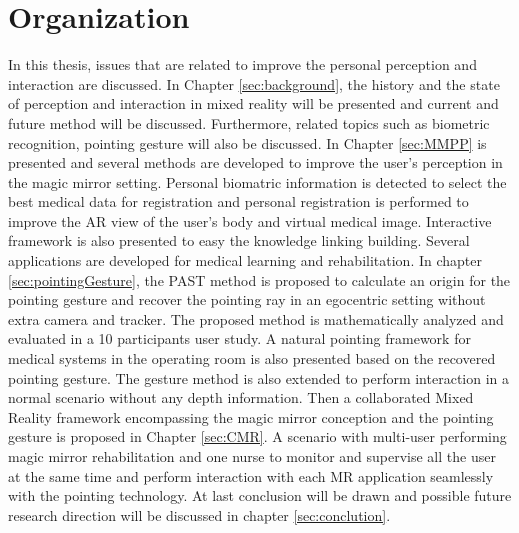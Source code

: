 \section{Organization}
In this thesis, issues that are related to improve the personal perception and interaction are discussed. In Chapter \ref{sec:background}, the history and the state of perception and interaction in mixed reality will be presented and current and future method will be discussed. Furthermore, related topics such as biometric recognition, pointing gesture will also be discussed. 
In Chapter \ref{sec:MMPP} is presented and several methods are developed to improve the user's perception in the magic mirror setting. Personal biomatric information is detected to select the best medical data for registration and personal registration is performed to improve the AR view of the user's body and virtual medical image. Interactive framework is also presented to easy the knowledge linking building. Several applications are developed for medical learning and rehabilitation.
In chapter \ref{sec:pointingGesture}, the PAST method is proposed to calculate an origin for the pointing gesture and recover the pointing ray in an egocentric setting without extra camera and tracker. The proposed method is mathematically analyzed and evaluated in a 10 participants user study. A natural pointing framework for medical systems in the operating room is also presented based on the recovered pointing gesture. The gesture method is also extended to perform interaction in a normal scenario without any depth information. 
Then a collaborated Mixed Reality framework encompassing the magic mirror conception and the pointing gesture is proposed in Chapter \ref{sec:CMR}. A scenario with multi-user performing magic mirror rehabilitation and one nurse to monitor and supervise all the user at the same time and perform interaction with each MR application seamlessly with the pointing technology. 
At last conclusion will be drawn and possible future research direction will be discussed in chapter \ref{sec:conclution}.